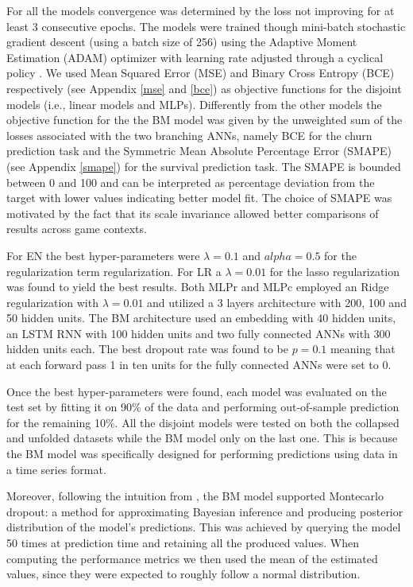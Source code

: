 For all the models convergence was determined by the loss not improving for at least 3 consecutive epochs. The models were trained though mini-batch stochastic gradient descent (using a batch size of 256) using the Adaptive Moment Estimation (ADAM) optimizer \cite{kingma2014adam} with learning rate adjusted through a cyclical policy \cite{smith2017cyclical, chollet2015keras}. We used Mean Squared Error (MSE) and Binary Cross Entropy (BCE) respectively (see Appendix \ref{mse} and \ref{bce}) as objective functions for the disjoint models (i.e., linear models and MLPs). Differently from the other models the objective function for the the BM model was given by the unweighted sum of the losses associated with the two branching ANNs, namely BCE for the churn prediction task and the Symmetric Mean Absolute Percentage Error (SMAPE) (see Appendix \ref{smape}) for the survival prediction task. The SMAPE is bounded between 0 and 100 and can be interpreted as percentage deviation from the target with lower values indicating better model fit. The choice of SMAPE was motivated by the fact that its scale invariance allowed better comparisons of results across game contexts. 

For EN the best hyper-parameters were $\lambda = 0.1$ and $alpha=0.5$ for the regularization term regularization. For LR a $\lambda = 0.01$ for the lasso regularization was found to yield the best results. Both MLPr and MLPc employed an Ridge regularization with $\lambda=0.01$ and utilized a 3 layers architecture with 200, 100 and 50 hidden units. The BM architecture used an embedding with 40 hidden units, an LSTM RNN with 100 hidden units and two fully connected ANNs with 300 hidden units each. The best dropout rate was found to be $p=0.1$ meaning that at each forward pass 1 in ten units for the fully connected ANNs were set to 0. 

Once the best hyper-parameters were found, each model was evaluated on the test set by fitting it on 90\% of the data and performing out-of-sample prediction for the remaining 10\%. All the disjoint models were tested on both the collapsed and unfolded datasets while the BM model only on the last one. This is because the BM model was specifically designed for performing predictions using data in a time series format. 

Moreover, following the intuition from \cite{gal2016dropout}, the BM model supported Montecarlo dropout: a method for approximating Bayesian inference and producing posterior distribution of the model's predictions. This was achieved by querying the model 50 times at prediction time and retaining all the produced values. When computing the performance metrics we then used the mean of the estimated values, since they were expected to roughly follow a normal distribution. 

